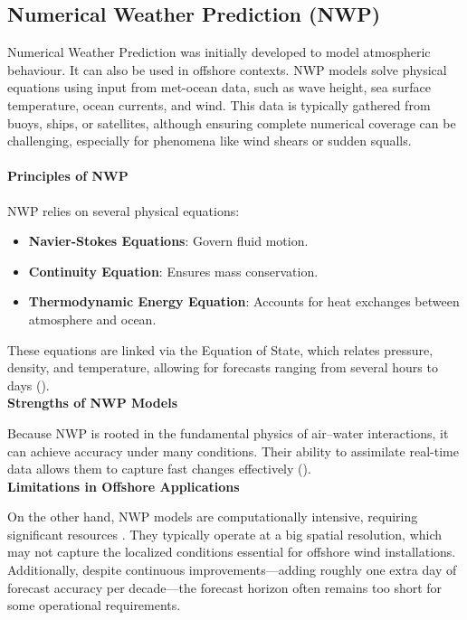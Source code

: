 \subsection{Numerical Weather Prediction (NWP)}
Numerical Weather Prediction was initially developed to model atmospheric behaviour. It can also be used in offshore contexts. NWP models solve physical equations using input from met-ocean data, such as wave height, sea surface temperature, ocean currents, and wind. This data is typically gathered from buoys, ships, or satellites, although ensuring complete numerical coverage can be challenging, especially for phenomena like wind shears or sudden squalls.

\paragraph{Principles of NWP}
NWP relies on several physical equations:
\begin{itemize}
    \item \textbf{Navier-Stokes Equations}: Govern fluid motion.
    \item \textbf{Continuity Equation}: Ensures mass conservation.
    \item \textbf{Thermodynamic Energy Equation}: Accounts for heat exchanges between atmosphere and ocean.
\end{itemize}
These equations are linked via the Equation of State, which relates pressure, density, and temperature, allowing for forecasts ranging from several hours to days (\cite{coiffier2011, bauer2015}).\\

\noindent\textbf{Strengths of NWP Models}

\noindent Because NWP is rooted in the fundamental physics of air–water interactions, it can achieve accuracy under many conditions. Their ability to assimilate real-time data allows them to capture fast changes effectively (\cite{coiffier2011}).\\

\noindent\textbf{Limitations in Offshore Applications}

\noindent On the other hand, NWP models are computationally intensive, requiring significant resources \cite{bauer2015}. They typically operate at a big spatial resolution, which may not capture the localized conditions essential for offshore wind installations. Additionally, despite continuous improvements—adding roughly one extra day of forecast accuracy per decade—the forecast horizon often remains too short for some operational requirements.

